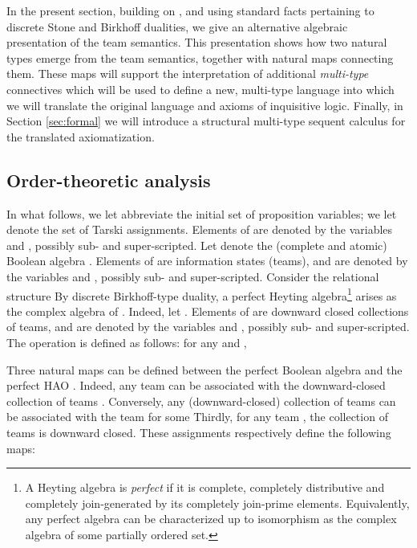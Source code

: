 In the present section, building on \cite{AbramskyVaananen08, Roelofsen_algebraic_13}, and using standard facts pertaining to discrete Stone and Birkhoff dualities, we give an alternative algebraic presentation of the team semantics. This presentation shows how two natural types emerge from the team semantics, together with natural maps connecting them. These maps will  support the interpretation of additional {\em multi-type} connectives which will be used to define a new, multi-type language into which we will translate the original language and axioms of inquisitive logic. Finally, in Section \ref{sec:formal} we will introduce a structural  multi-type sequent calculus for the translated axiomatization.

\subsection{Order-theoretic analysis}
\label{ssec:semanticanalysis}





In what follows, we let  abbreviate the initial set  of proposition variables; we let  denote the set of Tarski assignments. Elements of  are denoted by the variables  and , possibly sub- and super-scripted. Let  denote the (complete and atomic) Boolean algebra . Elements of  are information states (teams), and are denoted by the variables  and , possibly sub- and super-scripted. Consider the relational structure 
By discrete Birkhoff-type duality, a perfect Heyting algebra\footnote{A Heyting algebra is {\em perfect} if it is complete, completely distributive and completely join-generated by its completely join-prime elements. Equivalently, any perfect algebra can be characterized up to isomorphism as the complex algebra of some partially ordered set.} arises as the complex algebra of . Indeed,
let . Elements of  are downward closed collections of teams, and are denoted by the variables  and , possibly sub- and super-scripted. The operation  is defined as follows: for any  and ,









Three natural maps can be defined between the perfect Boolean algebra  and the perfect HAO . Indeed, any team  can be associated with the downward-closed collection of teams . Conversely, any (downward-closed) collection of teams  can be associated with the team   for some  Thirdly, for any team , the collection of teams   is downward closed. These assignments respectively define the following maps:


